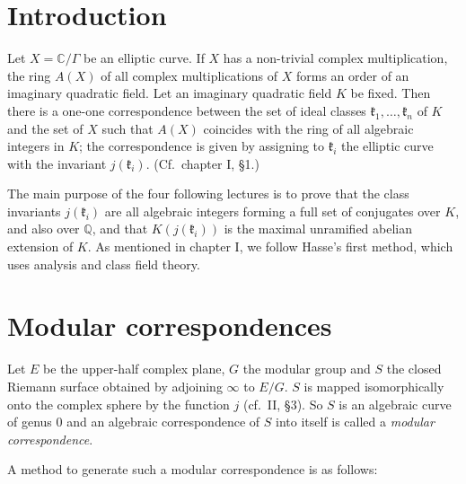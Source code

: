 
\setcounter{theorem}{0}
\renewcommand{\thetheorem}{\arabic{theorem}}

\section{Introduction}\label{sec:III-intro}

Let $X=\mathbb{C}/\Gamma$ be an elliptic curve. If $X$ has a non-trivial
complex multiplication, the ring $A(X)$ of all complex multiplications of
$X$ forms an order of an imaginary quadratic field. Let an imaginary
quadratic field $K$ be fixed. Then there is a one-one correspondence
between the set of ideal classes $\mathfrak{k}_{1},\ldots,\mathfrak{k}_{n}$
of $K$ and the set of $X$ such that $A(X)$ coincides with the ring of all
algebraic integers in $K$; the correspondence is given by assigning to
$\mathfrak{k}_{i}$ the elliptic curve with the invariant
$j(\mathfrak{k}_{i})$. (Cf.\ chapter I, §1.)

The main purpose of the four following lectures is to prove that the class
invariants $j(\mathfrak{k}_{i})$ are all algebraic integers forming a full
set of conjugates over $K$, and also over $\mathbb{Q}$, and that
$K(j(\mathfrak{k}_{i}))$ is the maximal unramified abelian extension of
$K$. As mentioned in chapter I, we follow Hasse's first method, which uses
analysis and class field theory.

\section{Modular correspondences}\label{sec:III-corr}

Let $E$ be the upper-half complex plane, $G$ the modular group and $S$ the
closed Riemann surface obtained by adjoining $\infty$ to $E/G$. $S$ is
mapped isomorphically onto the complex sphere by the function $j$ (cf.\ II,
§3). So $S$ is an algebraic curve of genus $0$ and an algebraic
correspondence of $S$ into itself is called a \emph{modular
correspondence}.

A method to generate such a modular correspondence is as follows:

